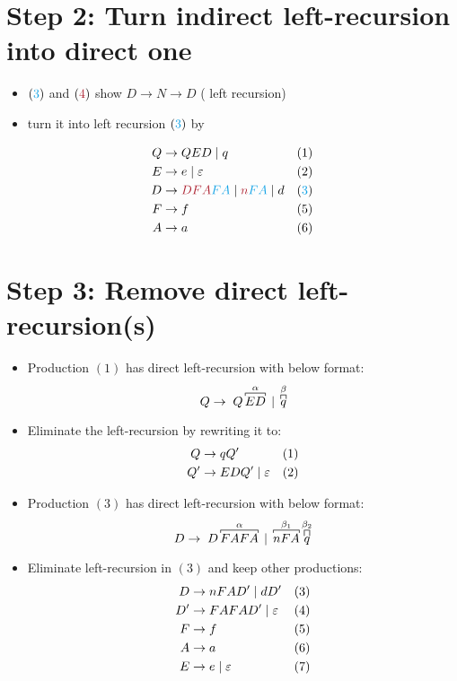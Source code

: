 \documentclass[10pt,a4paper,landscape]{article}
\begin{document}
\begin{multicols*}{3}
\section*{Step 2: Turn indirect left-recursion into direct one}
\begin{itemize}
\item $(\mb{3})$ and $(\mo{4})$ show $ D\to N\to D$ ( left recursion)
\item turn it into  left recursion $(\mb{3})$ by 
\end{itemize}
\begin{align*}
  Q\to &\; QED \gor q & (1)\\
  E\to &\; e \gor \varepsilon &(2) \\
  D\to &\; \mo{DFA}\mb{FA} \gor \mo{n}\mb{FA} \gor d &(\mb{3})\\
  F\to &\; f          & (5)\\
  A\to &\; a          & (6)
\end{align*}
\section*{Step 3: Remove direct left-recursion(s)}
\begin{itemize}
\item Production $(1)$ has direct left-recursion with below format:
  \[
    Q\to \; Q\overbracket[0.5pt][2pt]{ED}^{\alpha} \gor \overbracket[0.5pt][3pt]{q}^{\beta}
  \]
\item Eliminate the left-recursion by rewriting it to:
  \begin{align*}
    Q\to &\; q Q' & (1)\\
    Q'\to &\; EDQ' \;|\; \varepsilon &(2)
  \end{align*}
\item Production $(3)$ has direct left-recursion with below format:
  \[
    D\to \; D\overbracket[0.5pt][2pt]{FAFA}^{\alpha} \gor \overbracket[0.5pt][2pt]{nFA}^{\beta_1} \overbracket[0.5pt][4.5pt]{q}^{\beta_2}
  \]
\item Eliminate left-recursion in $(3)$ and keep other productions:
  \begin{align*}
    D\to &\; nFA D' \;|\; d D' & (3)\\
    D'\to &\; FAFAD' \;|\; \varepsilon &(4)\\
    F\to &\; f          & (5)\\
    A\to &\; a          & (6)\\
    E\to &\; e \;|\; \varepsilon &(7)
  \end{align*}
\end{itemize}

\end{multicols*}
\end{document}
